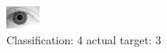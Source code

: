\begin{figure}[h!]
\begin{center}
\includegraphics[width=0.60\columnwidth]{figures/ID2188_class_4_target_3.png}
\end{center}
\caption{ Classification: 4 actual target: 3}
\label{fig:ID2188_class_4_target_3}
\end{figure}
